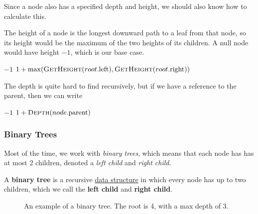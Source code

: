   Since a node also has a specified depth and height, we should also know how to calculate this. 

  \begin{algo}
    The height of a node is the longest downward path to a leaf from that node, so its height would be the maximum of the two heights of its children. A null node would have height $-1$, which is our base case. 
    \begin{algorithmic}[1]
        \State \Return $-1$
      \EndIf
      \State \Return $1 + \max(\Call{GetHeight}{root.\text{left}}, \Call{GetHeight}{root.\text{right}})$
    \EndProcedure
    \end{algorithmic}
  \end{algo}

  \begin{algo}
    The depth is quite hard to find recursively, but if we have a reference to the parent, then we can write 
    \begin{algorithmic}[1]
        \State \Return $-1$
      \Else
        \State \Return $1 + \Call{Depth}{node.\text{parent}}$
      \EndIf
    \EndProcedure
    \end{algorithmic}
  \end{algo}

\subsubsection{Binary Trees} 

  Most of the time, we work with \textit{binary trees}, which means that each node has has at most 2 children, denoted a \textit{left child} and \textit{right child}. 

  \begin{definition}
    \label{def:binary-tree}
    A \textbf{binary tree} is a recursive \hyperref[def:data-structure]{data structure} in which every node has up to two children, which we call the \textbf{left child} and \textbf{right child}. 

    \begin{figure}[H]
      \centering 
      \caption{An example of a binary tree. The root is 4, with a max depth of 3. } 
      \label{fig:binary_tree}
    \end{figure}
  \end{definition} 

